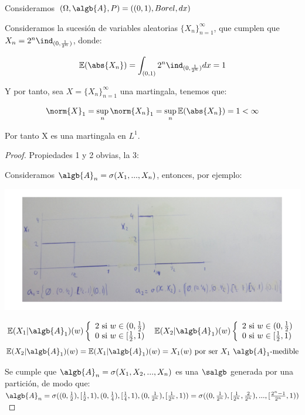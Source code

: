 \documentclass{apuntes}
\begin{document}
\begin{example}
Consideramos $(\Omega, \algb{A}, P) = ((0,1), Borel, dx)$

Consideramos la sucesión de variables aleatorias $\{X_n\}_{n=1}^{\infty}$, que cumplen que $X_n = 2^n \ind_{(0, \frac{1}{2^n})}$, donde:

$$\mathbb{E}(\abs{X_n})= \int_{(0,1)} 2^n \ind_{(0, \frac{1}{2^n})} dx=1$$

Y por tanto, sea $X=\{X_n\}_{n=1}^{\infty}$ una martingala, tenemos que:

$$\norm{X}_1 = \sup_n \norm{X_n}_1 = \sup_n \mathbb{E}(\abs{X_n}) = 1 < \infty$$

Por tanto X es una martingala en $L^1$.
\begin{proof}
Propiedades 1 y 2 obvias, la 3:

Consideramos $\algb{A}_n=\sigma(X_1,...,X_n)$, entonces, por ejemplo:

\begin{center}
\includegraphics[scale=0.55]{img/grafica1.png}
\end{center}


$$
\mathbb{E}(X_1|\algb{A}_1)(w)
  \left\lbrace
  \begin{array}{l}
     2 \text{ si } w \in (0,\frac{1}{2}) \\
     0 \text{ si } w \in [\frac{1}{2}, 1) \\
  \end{array}
  \right. \text{   }
\mathbb{E}(X_2|\algb{A}_1)(w)
    \left\lbrace
    \begin{array}{l}
       2 \text{ si } w \in (0,\frac{1}{2}) \\
       0 \text{ si } w \in [\frac{1}{2}, 1) \\
    \end{array}
    \right.
$$
$$
\mathbb{E}(X_2|\algb{A}_1)(w) = \mathbb{E}(X_1|\algb{A}_1)(w) = X_1(w) \text{ por ser } X_1 \text{ } \algb{A}_1\text{-medible}
$$

Se cumple que $\algb{A}_n = \sigma(X_1, X_2,...,X_n)$ es una $\salgb$ generada por una partición, de modo que: $\algb{A}_n=\sigma((0,\frac{1}{2}),[\frac{1}{2}, 1),(0,\frac{1}{4}),[\frac{1}{4}, 1), (0,\frac{1}{2^n}),[\frac{1}{2^n}, 1)) = \sigma((0,\frac{1}{2^n}), [\frac{1}{2^n}, \frac{2}{2^n}),...,[\frac{2^n -1}{2^n},1))$


\end{proof}
\end{example}
\end{document}
